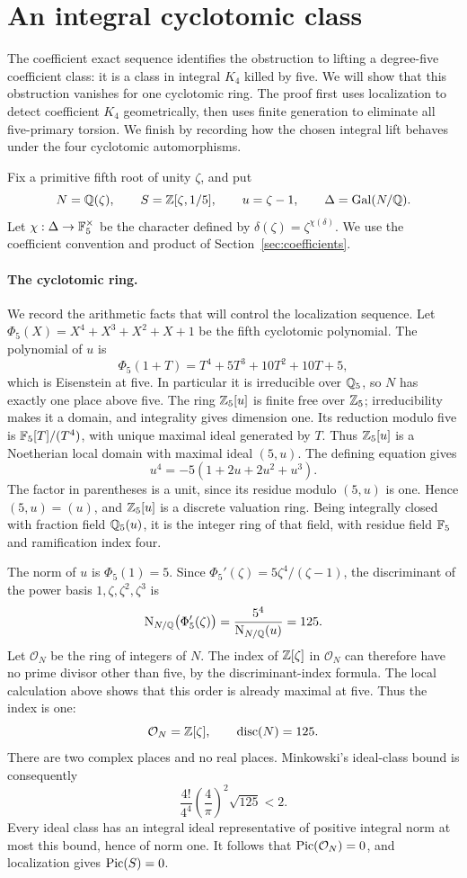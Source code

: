 \section{An integral cyclotomic class}
\label{sec:arithmetic}

The coefficient exact sequence identifies the obstruction to lifting a
degree-five coefficient class: it is a class in integral $K_4$ killed by
five.  We will show that this obstruction vanishes for one cyclotomic
ring.  The proof first uses localization to detect coefficient $K_4$
geometrically, then uses finite generation to eliminate all five-primary
torsion.  We finish by recording how the chosen integral lift behaves
under the four cyclotomic automorphisms.

Fix a primitive fifth root of unity $\zeta$, and put
\[
 N=\mathbb Q(\zeta),\qquad S=\mathbb Z[\zeta,1/5],\qquad
 u=\zeta-1,\qquad \Delta=\operatorname{Gal}(N/\mathbb Q).
\]
Let $\chi:\Delta\to\mathbb F_5^\times$ be the character defined by
$\delta(\zeta)=\zeta^{\chi(\delta)}$.  We use the coefficient convention and product of Section~\ref{sec:coefficients}.

\paragraph{The cyclotomic ring.}
We record the arithmetic facts that will control the localization
sequence.  Let $\Phi_5(X)=X^4+X^3+X^2+X+1$ be the fifth cyclotomic
polynomial.  The polynomial of $u$ is
\[
 \Phi_5(1+T)=T^4+5T^3+10T^2+10T+5,
\]
which is Eisenstein at five.  In particular it is irreducible over
$\mathbb Q_5$, so $N$ has exactly one place above five.  The ring $\mathbb Z_5[u]$ is
finite free over $\mathbb Z_5$; irreducibility makes it a domain, and integrality
gives dimension one.  Its reduction modulo five is $\mathbb F_5[T]/(T^4)$,
with unique maximal ideal generated by $T$.  Thus $\mathbb Z_5[u]$ is a
Noetherian local domain with maximal ideal $(5,u)$.  The defining equation
gives
\[
 u^4=-5(1+2u+2u^2+u^3).
\]
The factor in parentheses is a unit, since its residue modulo $(5,u)$
is one.  Hence $(5,u)=(u)$, and $\mathbb Z_5[u]$ is a discrete valuation ring.
Being integrally closed with fraction field $\mathbb Q_5(u)$, it is the integer
ring of that field, with residue field $\mathbb F_5$ and ramification index four.

The norm of $u$ is $\Phi_5(1)=5$.  Since
$\Phi_5'(\zeta)=5\zeta^4/(\zeta-1)$, the discriminant of the power
basis $1,\zeta,\zeta^2,\zeta^3$ is
\[
 \operatorname{N}_{N/\mathbb Q}\bigl(\Phi_5'(\zeta)\bigr)
 =\frac{5^4}{\operatorname{N}_{N/\mathbb Q}(u)}=125.
\]
Let $\mathcal O_N$ be the ring of integers of $N$.  The index of
$\mathbb Z[\zeta]$ in $\mathcal O_N$ can therefore have
no prime divisor other than five, by the discriminant-index formula.
The local calculation above shows that this order is already maximal
at five.  Thus the index is one:
\[
 \mathcal O_N=\mathbb Z[\zeta],\qquad \operatorname{disc}(N)=125.
\]
There are two complex places and no real places.  Minkowski's ideal-class
bound \cite[Chapter~4, Theorem~4.3]{MilneANT2020} is consequently
\[
 \frac{4!}{4^4}\left(\frac4\pi\right)^2\sqrt{125}<2.
\]
Every ideal class has an integral ideal representative of positive
integral norm at most this bound, hence of norm one.  It follows that
$\operatorname{Pic}(\mathcal O_N)=0$, and localization gives $\operatorname{Pic}(S)=0$.

